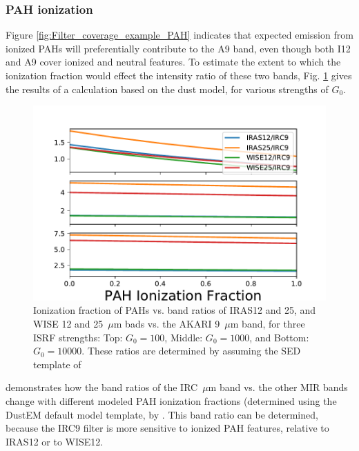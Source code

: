       \subsubsection{PAH ionization}
      Figure \ref{fig:Filter_coverage_example_PAH} indicates that expected emission from ionized PAHs will preferentially contribute to the A9 band, even though both I12 and A9 cover ionized and neutral features. To estimate the extent to which the ionization fraction would effect the intensity ratio of these two bands, Fig. \ref{fig:inband_ionfrac_ratios} gives the results of a calculation based on the \cite{drli01} dust model, for various strengths of $G_{0}$.
      \begin{figure}
          \centering
          \includegraphics[width=150mm]{../Plots/band-ratio-multiple.pdf}
          \caption{Ionization fraction of PAHs vs. band ratios of IRAS12 and 25, and WISE 12 and 25~$\mu$m bads vs. the AKARI 9~$\mu$m band, for three ISRF strengths: Top: $G_{0} = 100$, Middle: $G_{0} = 1000$, and Bottom: $G_{0} = 10000$. These ratios are determined by assuming the SED template of \cite{dustem11} }
          \label{fig:inband_ionfrac_ratios}
      \end{figure}
         demonstrates how the band ratios of the IRC~$\mu$m band vs. the other MIR bands change with different modeled PAH ionization fractions (determined using the DustEM default model template, by \cite{dustem11}. This band ratio can be determined, because the IRC9 filter is more sensitive to ionized PAH features, relative to IRAS12 or to WISE12.

